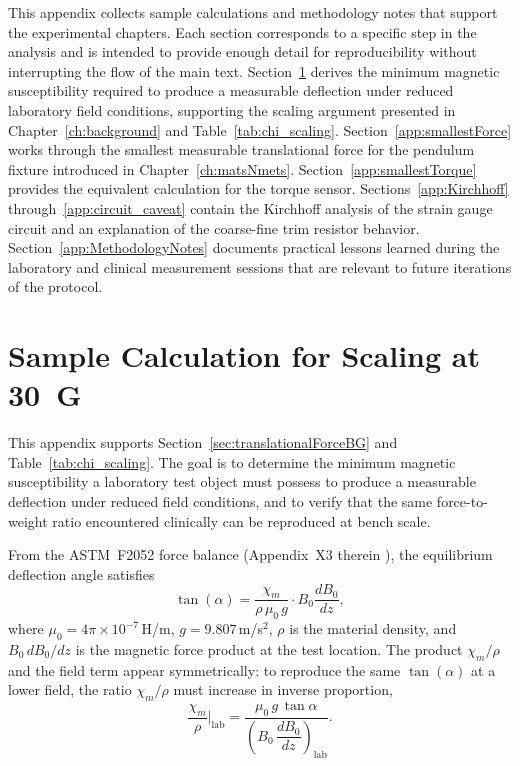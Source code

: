 
This appendix collects sample calculations and methodology notes that support
the experimental chapters. Each section corresponds to a specific step in the
analysis and is intended to provide enough detail for reproducibility without
interrupting the flow of the main text. Section~\ref{app:scaling} derives the
minimum magnetic susceptibility required to produce a measurable deflection under
reduced laboratory field conditions, supporting the scaling argument presented in
Chapter~\ref{ch:background} and Table~\ref{tab:chi_scaling}. 
Section~\ref{app:smallestForce} works through the smallest measurable translational
force for the pendulum fixture introduced in Chapter~\ref{ch:matsNmets}.
Section~\ref{app:smallestTorque} provides the equivalent calculation for the torque
sensor. Sections~\ref{app:Kirchhoff} through~\ref{app:circuit_caveat} contain
the Kirchhoff analysis of the strain gauge circuit and an explanation of the
coarse-fine trim resistor behavior. Section~\ref{app:MethodologyNotes} documents
practical lessons learned during the laboratory and clinical measurement sessions
that are relevant to future iterations of the protocol.


\section{Sample Calculation for Scaling at 30~G}
\label{app:scaling}

This appendix supports Section~\ref{sec:translationalForceBG} and
Table~\ref{tab:chi_scaling}. The goal is to determine the minimum magnetic
susceptibility a laboratory test object must possess to produce a measurable
deflection under reduced field conditions, and to verify that the same
force-to-weight ratio encountered clinically can be reproduced at bench scale.

From the ASTM~F2052 force balance (Appendix~X3 therein \cite{astmF2052}),
the equilibrium deflection angle satisfies
\begin{equation}
	\tan(\alpha) = \frac{\chi_m}{\rho\,\mu_0\,g}
	\cdot B_0\frac{dB_0}{dz},
	\label{eq:forFit_app}
\end{equation}
where $\mu_0 = 4\pi\times10^{-7}$\,H/m, $g = 9.807$\,m/s$^2$, $\rho$ is the
material density, and $B_0\,dB_0/dz$ is the magnetic force product at the
test location. The product $\chi_m/\rho$ and the field term appear
symmetrically: to reproduce the same $\tan(\alpha)$ at a lower field, the
ratio $\chi_m/\rho$ must increase in inverse proportion,
\begin{equation}
	\frac{\chi_m}{\rho}\bigg|_{\mathrm{lab}}
	= \frac{\mu_0\,g\,\tan\alpha}
	{\left(B_0\,\dfrac{dB_0}{dz}\right)_{\!\mathrm{lab}}}.
	\label{eq:chi_rho_lab}
\end{equation}

